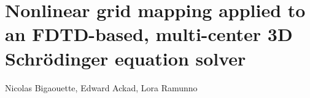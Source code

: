 
\newcommand{\PaperTitleMapping}{Nonlinear grid mapping applied to an FDTD-based, multi-center 3D
                                  Schr\"odinger equation solver}

\section{\PaperTitleMapping}
\label{section:papers:qfdtd}

\begin{flushright}
Nicolas Bigaouette, Edward Ackad, Lora Ramunno
\end{flushright}




